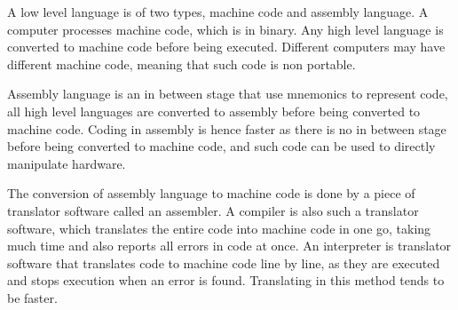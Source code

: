 A low level language is of two types, machine code and assembly language. A computer processes
machine code, which is in binary. Any high level language is converted to machine code before
being executed. Different computers may have different machine code, meaning that such code is
non portable.

Assembly language is an in between stage that use mnemonics to represent code, all high level
languages are converted to assembly before being converted to machine code. Coding in assembly
is hence faster as there is no in between stage before being converted to machine code, and such
code can be used to directly manipulate hardware.

The conversion of assembly language to machine code is done by a piece of translator software 
called an assembler. A compiler is also such a translator software, which translates the entire
code into machine code in one go, taking much time and also reports all errors in code at once.
An interpreter is translator software that translates code to machine code line by line, as they
are executed and stops execution when an error is found. Translating in this method tends to be
faster.

